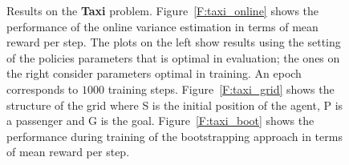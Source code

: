 \begin{figure}[t]
\begin{minipage}{.33\textwidth}
\begin{center}
\end{center}
\end{minipage}
\caption[Taxi problem results]{Results on the \textbf{Taxi} problem. Figure~\ref{F:taxi_online} shows the performance of the online variance estimation in terms of mean reward per step. The plots on the left show results using the setting of the policies parameters that is optimal in evaluation; the ones on the right consider parameters optimal in training. An epoch corresponds to $1000$ training steps. Figure~\ref{F:taxi_grid} shows the structure of the grid where S is the initial position of the agent, P is a passenger and G is the goal. Figure~\ref{F:taxi_boot} shows the performance during training of the bootstrapping approach in terms of mean reward per step.}\label{F:taxi}
\end{figure}

